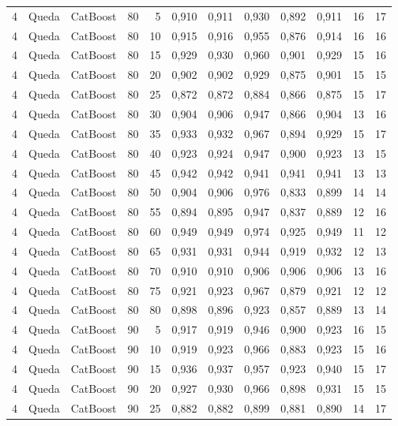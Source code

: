 \begin{longtable}{@{}rllrrrrrrrrr@{}}
4 & Queda & CatBoost & 80 & 5 & 0,910 & 0,911 & 0,930 & 0,892 & 0,911 & 16 & 17 \\
4 & Queda & CatBoost & 80 & 10 & 0,915 & 0,916 & 0,955 & 0,876 & 0,914 & 16 & 16 \\
4 & Queda & CatBoost & 80 & 15 & 0,929 & 0,930 & 0,960 & 0,901 & 0,929 & 15 & 16 \\
4 & Queda & CatBoost & 80 & 20 & 0,902 & 0,902 & 0,929 & 0,875 & 0,901 & 15 & 15 \\
4 & Queda & CatBoost & 80 & 25 & 0,872 & 0,872 & 0,884 & 0,866 & 0,875 & 15 & 17 \\
4 & Queda & CatBoost & 80 & 30 & 0,904 & 0,906 & 0,947 & 0,866 & 0,904 & 13 & 16 \\
4 & Queda & CatBoost & 80 & 35 & 0,933 & 0,932 & 0,967 & 0,894 & 0,929 & 15 & 17 \\
4 & Queda & CatBoost & 80 & 40 & 0,923 & 0,924 & 0,947 & 0,900 & 0,923 & 13 & 15 \\
4 & Queda & CatBoost & 80 & 45 & 0,942 & 0,942 & 0,941 & 0,941 & 0,941 & 13 & 13 \\
4 & Queda & CatBoost & 80 & 50 & 0,904 & 0,906 & 0,976 & 0,833 & 0,899 & 14 & 14 \\
4 & Queda & CatBoost & 80 & 55 & 0,894 & 0,895 & 0,947 & 0,837 & 0,889 & 12 & 16 \\
4 & Queda & CatBoost & 80 & 60 & 0,949 & 0,949 & 0,974 & 0,925 & 0,949 & 11 & 12 \\
4 & Queda & CatBoost & 80 & 65 & 0,931 & 0,931 & 0,944 & 0,919 & 0,932 & 12 & 13 \\
4 & Queda & CatBoost & 80 & 70 & 0,910 & 0,910 & 0,906 & 0,906 & 0,906 & 13 & 16 \\
4 & Queda & CatBoost & 80 & 75 & 0,921 & 0,923 & 0,967 & 0,879 & 0,921 & 12 & 12 \\
4 & Queda & CatBoost & 80 & 80 & 0,898 & 0,896 & 0,923 & 0,857 & 0,889 & 13 & 14 \\
4 & Queda & CatBoost & 90 & 5 & 0,917 & 0,919 & 0,946 & 0,900 & 0,923 & 16 & 15 \\
4 & Queda & CatBoost & 90 & 10 & 0,919 & 0,923 & 0,966 & 0,883 & 0,923 & 15 & 16 \\
4 & Queda & CatBoost & 90 & 15 & 0,936 & 0,937 & 0,957 & 0,923 & 0,940 & 15 & 17 \\
4 & Queda & CatBoost & 90 & 20 & 0,927 & 0,930 & 0,966 & 0,898 & 0,931 & 15 & 15 \\
4 & Queda & CatBoost & 90 & 25 & 0,882 & 0,882 & 0,899 & 0,881 & 0,890 & 14 & 17 \\

\end{longtable}
